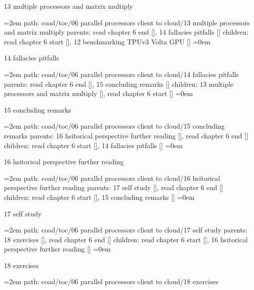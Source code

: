 13 multiple processors and matrix multiply
\smallskip
\par\begingroup
\leftskip=2em
path: coad/toc/06 parallel processors client to cloud/13 multiple processors and matrix multiply
\smallskip
parents:  read chapter 6 end [], 14 fallacies pitfalls []
\smallskip
children: read chapter 6 start [], 12 benchmarking TPUv3 Volta GPU []
\smallskip
\leftskip=0em
\par\endgroup
\bigskip
{}
14 fallacies pitfalls
\smallskip
\par\begingroup
\leftskip=2em
path: coad/toc/06 parallel processors client to cloud/14 fallacies pitfalls
\smallskip
parents:  read chapter 6 end [], 15 concluding remarks []
\smallskip
children: 13 multiple processors and matrix multiply [], read chapter 6 start []
\smallskip
\leftskip=0em
\par\endgroup
\bigskip
{}
15 concluding remarks
\smallskip
\par\begingroup
\leftskip=2em
path: coad/toc/06 parallel processors client to cloud/15 concluding remarks
\smallskip
parents:  16 hsitorical perspective further reading [], read chapter 6 end []
\smallskip
children: read chapter 6 start [], 14 fallacies pitfalls []
\smallskip
\leftskip=0em
\par\endgroup
\bigskip
{}
16 hsitorical perspective further reading
\smallskip
\par\begingroup
\leftskip=2em
path: coad/toc/06 parallel processors client to cloud/16 hsitorical perspective further reading
\smallskip
parents:  17 self study [], read chapter 6 end []
\smallskip
children: read chapter 6 start [], 15 concluding remarks []
\smallskip
\leftskip=0em
\par\endgroup
\bigskip
{}
17 self study
\smallskip
\par\begingroup
\leftskip=2em
path: coad/toc/06 parallel processors client to cloud/17 self study
\smallskip
parents:  18 exercises [], read chapter 6 end []
\smallskip
children: read chapter 6 start [], 16 hsitorical perspective further reading []
\smallskip
\leftskip=0em
\par\endgroup
\bigskip
{}
18 exercises
\smallskip
\par\begingroup
\leftskip=2em
path: coad/toc/06 parallel processors client to cloud/18 exercises
